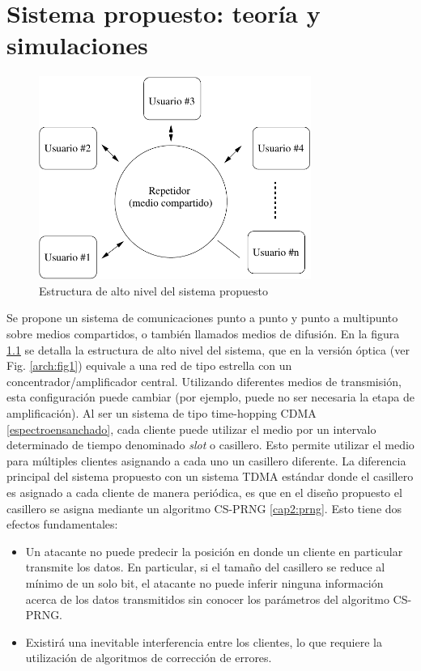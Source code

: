 \chapter{Sistema propuesto: teoría y simulaciones}

\begin{figure}[t]
\centering
\includegraphics[width=3.5in]{graphs/hub}
\caption{Estructura de alto nivel del sistema propuesto}
\label{fig_hub}
\end{figure}

Se propone un sistema de comunicaciones punto a punto y punto a multipunto sobre medios compartidos, o también llamados medios de difusión. En la figura \ref{fig_hub} se detalla la estructura de alto nivel del sistema, que en la versión óptica (ver Fig. \ref{arch:fig1}) equivale a una red de tipo estrella con un concentrador/amplificador central. Utilizando diferentes medios de transmisión, esta configuración puede cambiar (por ejemplo, puede no ser necesaria la etapa de amplificación).
Al ser un sistema de tipo time-hopping CDMA \ref{espectroensanchado}, cada cliente puede utilizar el medio por un intervalo determinado de tiempo denominado \textit{slot} o casillero. Esto permite utilizar el medio para múltiples clientes asignando a cada uno un casillero diferente. La diferencia principal del sistema propuesto con un sistema TDMA estándar donde el casillero es asignado a cada cliente de manera periódica, es que en el diseño propuesto el casillero se asigna mediante un algoritmo CS-PRNG \ref{cap2:prng}. Esto tiene dos efectos fundamentales: 

\begin{itemize}
 \item Un atacante no puede predecir la posición en donde un cliente en particular transmite los datos. En particular, si el tamaño del casillero se reduce al mínimo de un solo bit, el atacante no puede inferir ninguna información acerca de los datos transmitidos sin conocer los parámetros del algoritmo CS-PRNG.
 \item Existirá una inevitable interferencia entre los clientes, lo que requiere la utilización de algoritmos de corrección de errores.
\end{itemize}

